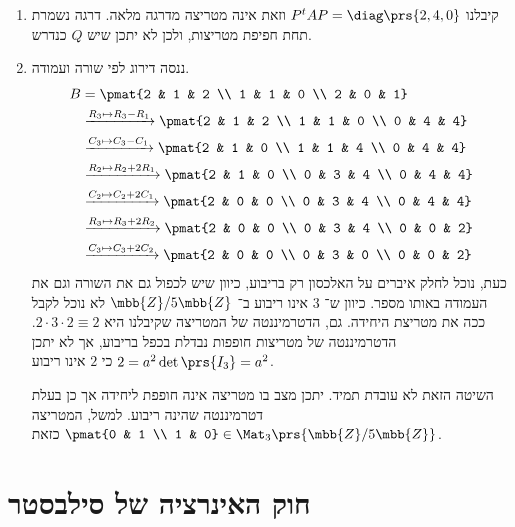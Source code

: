 \documentclass[a4paper,10pt,twoside,openany]{book}
\begin{document}
\begin{solution}
\begin{enumerate}
\item קיבלנו
$P^t A P = \diag\prs{2,4,0}$
וזאת אינה מטריצה מדרגה מלאה. דרגה נשמרת תחת חפיפת מטריצות, ולכן לא יתכן שיש
$Q$
כנדרש.

\item ננסה דירוג לפי שורה ועמודה.
\begin{align*}
    B &= \pmat{2 & 1 & 2 \\ 1 & 1 & 0 \\ 2 & 0 & 1}
    \\&\xrightarrow{R_3 \mapsto R_3 - R_1}
    \pmat{2 & 1 & 2 \\ 1 & 1 & 0 \\ 0 & 4 & 4}
    \\&\xrightarrow{C_3 \mapsto C_3 - C_1}
    \pmat{2 & 1 & 0 \\ 1 & 1 & 4 \\ 0 & 4 & 4}
    \\&\xrightarrow{R_2 \mapsto R_2 + 2 R_1}
    \pmat{2 & 1 & 0 \\ 0 & 3 & 4 \\ 0 & 4 & 4}
    \\&\xrightarrow{C_2 \mapsto C_2 + 2 C_1}
    \pmat{2 & 0 & 0 \\ 0 & 3 & 4 \\ 0 & 4 & 4}
    \\&\xrightarrow{R_3 \mapsto R_3 + 2 R_2}
    \pmat{2 & 0 & 0 \\ 0 & 3 & 4 \\ 0 & 0 & 2}
    \\&\xrightarrow{C_3 \mapsto C_3 + 2 C_2}
    \pmat{2 & 0 & 0 \\ 0 & 3 & 0 \\ 0 & 0 & 2}
\end{align*}
כעת, נוכל לחלק איברים על האלכסון רק בריבוע, כיוון שיש לכפול גם את השורה וגם את העמודה באותו מספר. כיוון ש־%
$3$
אינו ריבוע ב־%
$\mbb{Z}/5\mbb{Z}$
לא נוכל לקבל ככה את מטריצת היחידה.
גם, הדטרמיננטה של המטריצה שקיבלנו היא
$2 \cdot 3 \cdot 2 \equiv 2$.
הדטרמיננטה של מטריצות חופפות נבדלת בכפל בריבוע, אך לא יתכן
$2 = a^2 \det\prs{I_3} = a^2$
כי
$2$
אינו ריבוע.

השיטה הזאת לא עובדת תמיד. יתכן מצב בו מטריצה אינה חופפת ליחידה אך כן בעלת דטרמיננטה שהינה ריבוע.
למשל, המטריצה
$\pmat{0 & 1 \\ 1 & 0} \in \Mat_3\prs{\mbb{Z}/5\mbb{Z}}$
כזאת.
\end{enumerate}
\end{solution}

\section{חוק האינרציה של סילבסטר}
\end{document}
